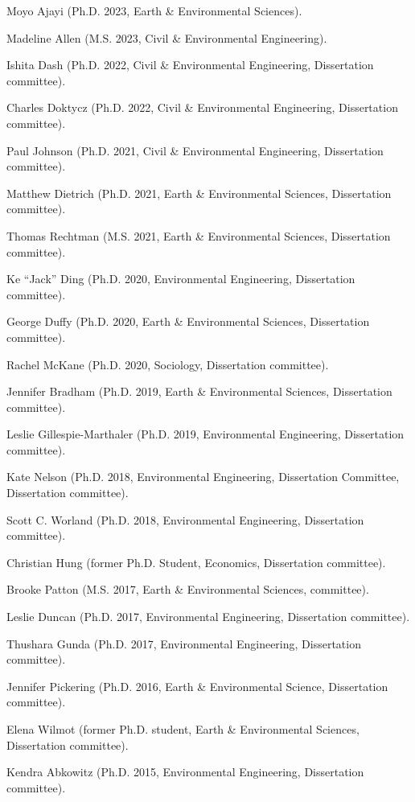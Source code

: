 \item Moyo Ajayi (Ph.D. 2023, Earth \& Environmental Sciences).
\item Madeline Allen (M.S. 2023, Civil \& Environmental Engineering).
\item Ishita Dash (Ph.D. 2022, Civil \& Environmental Engineering, Dissertation committee).
\item Charles Doktycz (Ph.D. 2022, Civil \& Environmental Engineering, Dissertation committee).
\item Paul Johnson (Ph.D. 2021, Civil \& Environmental Engineering, Dissertation committee).
\item Matthew Dietrich (Ph.D. 2021, Earth \& Environmental Sciences, Dissertation committee).
\item Thomas Rechtman (M.S. 2021, Earth \& Environmental Sciences, Dissertation committee).
\item Ke ``Jack'' Ding (Ph.D. 2020, Environmental Engineering, Dissertation committee).
\item George Duffy (Ph.D. 2020, Earth \& Environmental Sciences, Dissertation committee).
\item Rachel McKane (Ph.D. 2020, Sociology, Dissertation committee).
\item Jennifer Bradham (Ph.D. 2019, Earth \& Environmental Sciences, Dissertation committee).
\item Leslie Gillespie-Marthaler (Ph.D. 2019, Environmental Engineering, Dissertation committee).
\item Kate Nelson (Ph.D. 2018, Environmental Engineering, Dissertation Committee, Dissertation committee).
\item Scott C. Worland (Ph.D. 2018, Environmental Engineering, Dissertation committee).
\item Christian Hung (former Ph.D. Student, Economics, Dissertation committee).
\item Brooke Patton (M.S. 2017, Earth \& Environmental Sciences, committee).
\item Leslie Duncan (Ph.D. 2017, Environmental Engineering, Dissertation committee).
\item Thushara Gunda (Ph.D. 2017, Environmental Engineering, Dissertation committee).
\item Jennifer Pickering (Ph.D. 2016, Earth \& Environmental Science, Dissertation committee).
\item Elena Wilmot (former Ph.D. student, Earth \& Environmental Sciences, Dissertation committee).
\item Kendra Abkowitz (Ph.D. 2015, Environmental Engineering, Dissertation committee).
